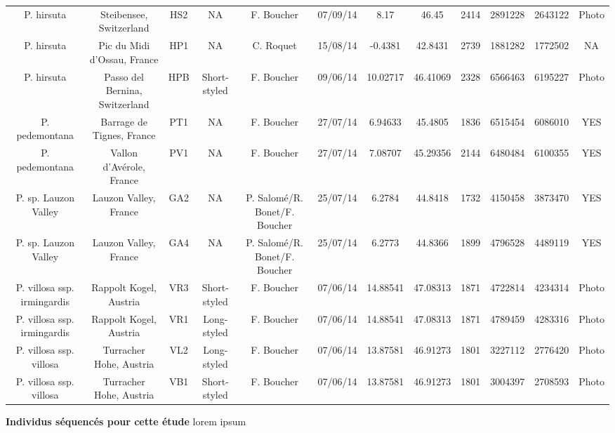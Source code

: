\documentclass[12pt,a4paper,notitlepage]{article}
\begin{document}
\begin{landscape}
\begin{annexe}
{\begin{tabular}{cccccccccccc}
P. hirsuta &Steibensee, Switzerland &HS2 & NA &F. Boucher &07/09/14 & 8.17 & 46.45 &2414&2891228&2643122&Photo \\
P. hirsuta &Pic du Midi d'Ossau, France &HP1 & NA &C. Roquet &15/08/14 & -0.4381 & 42.8431 &2739&1881282&1772502& NA \\
P. hirsuta &Passo del Bernina, Switzerland &HPB &Short-styled &F. Boucher &09/06/14 & 10.02717 & 46.41069 &2328&6566463&6195227&Photo \\
P. pedemontana &Barrage de Tignes, France &PT1 & NA &F. Boucher &27/07/14 & 6.94633 & 45.4805 &1836&6515454&6086010&YES \\
P. pedemontana &Vallon d'Avérole, France &PV1 & NA &F. Boucher &27/07/14 & 7.08707 & 45.29356 &2144&6480484&6100355&YES \\
P. sp. Lauzon Valley &Lauzon Valley, France &GA2 & NA &P. Salomé/R. Bonet/F. Boucher &25/07/14 & 6.2784 & 44.8418 &1732&4150458&3873470&YES \\
P. sp. Lauzon Valley &Lauzon Valley, France &GA4 & NA &P. Salomé/R. Bonet/F. Boucher &25/07/14 & 6.2773 & 44.8366 &1899&4796528&4489119&YES \\
P. villosa ssp. irmingardis &Rappolt Kogel, Austria &VR3 &Short-styled &F. Boucher &07/06/14 & 14.88541 & 47.08313 &1871&4722814&4234314&Photo \\
P. villosa ssp. irmingardis &Rappolt Kogel, Austria &VR1 &Long-styled &F. Boucher &07/06/14 & 14.88541 & 47.08313 &1871&4789459&4283316&Photo \\
P. villosa ssp. villosa &Turracher Hohe, Austria &VL2 &Long-styled &F. Boucher &07/06/14 & 13.87581 & 46.91273 &1801&3227112&2776420&Photo \\
P. villosa ssp. villosa &Turracher Hohe, Austria &VB1 &Short-styled &F. Boucher &07/06/14 & 13.87581 & 46.91273 &1801&3004397&2708593&Photo \\
	\bottomrule
	\end{tabular}}
	\caption{\textbf{Individus séquencés pour cette étude} lorem ipsum}
	\label{table_ind}
\end{annexe}
\end{landscape}

\end{document}
